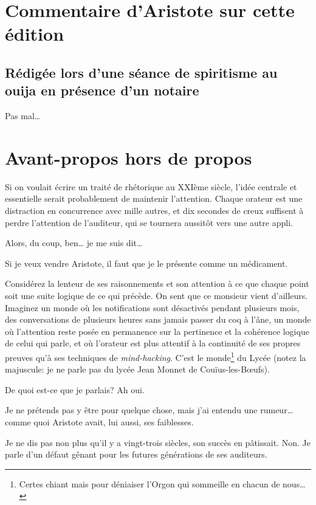 
\tableofcontents

\newpage

\section*{Commentaire d'Aristote sur cette édition}
\subsection*{Rédigée lors d'une séance de spiritisme au ouija en présence d'un notaire}

Pas mal\dots{}

\newpage

\section*{Avant-propos hors de propos}

Si on voulait écrire un traité de rhétorique au XXIème siècle, l'idée centrale et essentielle serait
probablement de maintenir l'attention. Chaque orateur est une distraction en concurrence avec mille
autres, et dix secondes de creux suffisent à perdre l'attention de l'auditeur, qui se tournera aussitôt
vers une autre appli. 

Alors, du coup, ben\dots{} je me suis dit\dots{}

Si je veux vendre Aristote, il faut que je le présente comme un médicament. 

Considérez la lenteur de ses raisonnements et son attention à ce que chaque point soit une suite logique
de ce qui précède. On sent que ce monsieur vient d'ailleurs. Imaginez un monde où les notifications sont
désactivés pendant plusieurs mois, des conversations de plusieurs heures sans jamais passer du coq à l’âne,
un monde où l'attention reste posée en permanence sur la pertinence et la cohérence logique de celui qui
parle, et où l'orateur est plus attentif à la continuité de ses propres preuves qu'à ses techniques de
\emph{mind-hacking}. C'est le monde\footnote{Certes chiant mais pour déniaiser l'Orgon qui sommeille en
chacun de nous\dots{}} du Lycée (notez la majuscule: je ne parle pas du lycée Jean Monnet de Couïus-les-Bœufs).

De quoi est-ce que je parlais? Ah oui.

Je ne prétends pas y être pour quelque chose, mais j'ai entendu une rumeur\dots{} comme quoi Aristote avait,
lui aussi, ses faiblesses.

Je ne dis pas non plus qu'il y a vingt-trois siècles, son succès en pâtissait. Non. Je parle d'un défaut gênant
pour les futures générations de ses auditeurs.

